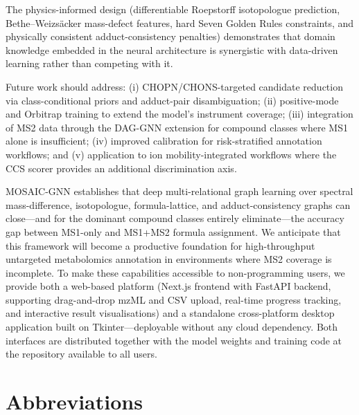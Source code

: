 \documentclass[journal=jcisd8]{achemso}
\begin{document}
\begin{sloppypar}
The physics-informed design (differentiable Roepstorff isotopologue prediction,
Bethe--Weizs{\"a}cker mass-defect features, hard Seven Golden Rules constraints,
and physically consistent adduct-consistency penalties) demonstrates that domain
knowledge embedded in the neural architecture is synergistic with data-driven
learning rather than competing with it.
\end{sloppypar}

Future work should address: (i) CHOPN/CHONS-targeted candidate reduction
via class-conditional priors and adduct-pair disambiguation; (ii) positive-mode
and Orbitrap training to extend the model's instrument coverage;
(iii) integration of MS2 data through the DAG-GNN extension for compound classes
where MS1 alone is insufficient; (iv) improved calibration for risk-stratified
annotation workflows; and (v) application to ion mobility-integrated workflows
where the CCS scorer provides an additional discrimination axis.

MOSAIC-GNN establishes that deep multi-relational graph learning over spectral
mass-difference, isotopologue, formula-lattice, and adduct-consistency graphs
can close---and for the dominant compound classes entirely eliminate---the accuracy
gap between MS1-only and MS1+MS2 formula assignment.  We anticipate that this
framework will become a productive foundation for high-throughput untargeted
metabolomics annotation in environments where MS2 coverage is incomplete.
To make these capabilities accessible to non-programming users, we provide both
a web-based platform (Next.js frontend with FastAPI backend, supporting
drag-and-drop mzML and CSV upload, real-time progress tracking, and interactive
result visualisations) and a standalone cross-platform desktop application built
on Tkinter---deployable without any cloud dependency.  Both interfaces are
distributed together with the model weights and training code at the repository
available to all users.

\clearpage
\section*{Abbreviations}
\end{document}
